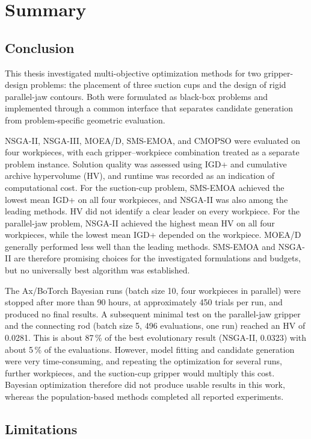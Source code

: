 \chapter{Summary}
\label{sec:summary}

\section{Conclusion}

This thesis investigated multi-objective optimization methods for two
gripper-design problems: the placement of three suction cups and the design of
rigid parallel-jaw contours. Both were formulated as black-box problems and
implemented through a common interface that separates candidate generation from
problem-specific geometric evaluation.

NSGA-II, NSGA-III, MOEA/D, SMS-EMOA, and CMOPSO were evaluated on four
workpieces, with each gripper--workpiece combination treated as a separate
problem instance. Solution quality was assessed using IGD+ and cumulative
archive hypervolume (HV), and runtime was recorded as an indication of
computational cost. For the suction-cup problem, SMS-EMOA achieved the lowest
mean IGD+ on all four workpieces, and NSGA-II was also among the leading
methods. HV did not identify a clear leader on every workpiece. For the
parallel-jaw problem, NSGA-II achieved the highest mean HV on all four
workpieces, while the lowest mean IGD+ depended on the workpiece. MOEA/D
generally performed less well than the leading methods. SMS-EMOA and NSGA-II are
therefore promising choices for the investigated formulations and budgets, but no
universally best algorithm was established.

The Ax/BoTorch Bayesian runs (batch size 10, four workpieces in parallel) were
stopped after more than 90 hours, at approximately 450 trials per run, and
produced no final results. A subsequent minimal test on the parallel-jaw gripper
and the connecting rod (batch size 5, 496 evaluations, one run) reached an HV of
0.0281. This is about 87\,\% of the best evolutionary result (NSGA-II, 0.0323)
with about 5\,\% of the evaluations. However, model fitting and candidate
generation were very time-consuming, and repeating the optimization for several
runs, further workpieces, and the suction-cup gripper would multiply this cost.
Bayesian optimization therefore did not produce usable results in this work,
whereas the population-based methods completed all reported experiments.

\section{Limitations}
\label{sec:limitations}


